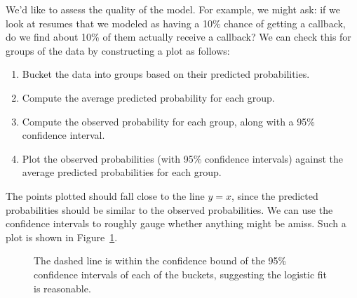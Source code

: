 We'd like to assess the quality of the model.
For example, we might ask:
if we look at resumes that we modeled as having
a 10\% chance of getting a callback, do we find
about 10\% of them actually receive a callback?
We can check this for groups of the data by constructing
a plot as follows:
\begin{enumerate}
\item
    Bucket the data into groups based on their
    predicted probabilities.
\item
    Compute the average predicted probability for each group.
\item
    Compute the observed probability for each group,
    along with a 95\% confidence interval.
\item
    Plot the observed probabilities
    (with 95\% confidence intervals)
    against the average predicted probabilities for each group.
\end{enumerate}
The points plotted should fall close to the line $y = x$,
since the predicted probabilities should be similar to the
observed probabilities.
We can use the confidence intervals to roughly gauge whether
anything might be amiss.
Such a plot is shown in Figure~\ref{logisticModelBucketDiag}.

%

\begin{figure}
  \centering
  \caption{The dashed line is within the confidence bound
       of the 95\% confidence intervals of each of the buckets,
       suggesting the logistic fit is reasonable.}
  \label{logisticModelBucketDiag}
\end{figure}

